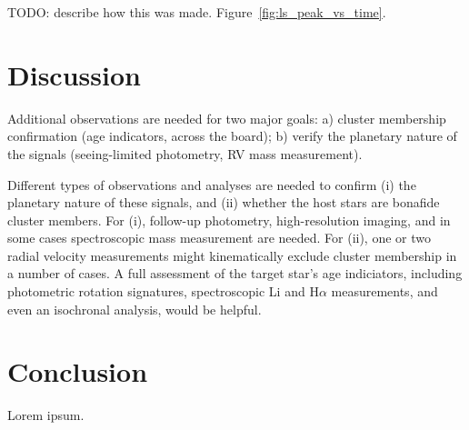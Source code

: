 \documentclass[12pt,twocolumn,tighten]{aastex62}
\begin{document}
TODO: describe how this was made.
Figure~\ref{fig:ls_peak_vs_time}.


\section{Discussion}
\label{sec:discussion}

Additional observations are needed for two major goals:
a) cluster membership confirmation
(age indicators, across the board);
b) verify the planetary nature of the signals
(seeing-limited photometry, RV mass measurement).

Different types of observations and analyses are needed to confirm 
(i) the planetary nature of these signals, and
(ii) whether the host stars are bonafide cluster members.
For (i), follow-up photometry, high-resolution imaging, and in some
cases spectroscopic mass measurement are needed.
For (ii), one or two radial velocity measurements might kinematically
exclude cluster membership in a number of cases.
A full assessment of the target star's age indiciators, including
photometric rotation signatures, spectroscopic Li and H$\alpha$
measurements, and even an isochronal analysis, would be helpful.



\section{Conclusion}
\label{sec:conclusion}

Lorem ipsum.
\end{document}
